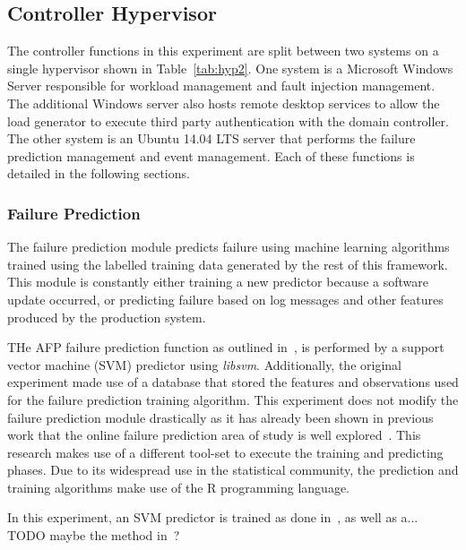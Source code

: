 \tabHypervisorOne
\tabHypervisorTwo

\setcounter{secnumdepth}{5}

\subsection{Controller Hypervisor} \label{sec:controller} %
The controller functions in this experiment are split between two systems on a
single hypervisor shown in Table~\ref{tab:hyp2}.  One system is a Microsoft
Windows Server responsible for workload management and fault injection
management.  The additional Windows server also hosts remote desktop services
to allow the load generator to execute third party authentication with the
domain controller.  The other system is an Ubuntu 14.04 LTS server that
performs the failure prediction management and event management.  Each of
these functions is detailed in the following sections.

\subsubsection{Failure Prediction} \label{sec:failurePrediction} %
The failure prediction module predicts failure using machine learning
algorithms trained using the labelled training data generated by the rest of
this framework.  This module is constantly either training a new predictor
because a software update occurred, or predicting failure based on log messages
and other features produced by the production system.

THe AFP failure prediction function as outlined in~\cite{irrera2015}, is
performed by a support vector machine (SVM) predictor using \emph{libsvm}.
Additionally, the original experiment made use of a database that stored the
features and observations used for the failure prediction training algorithm.
This experiment does not modify the failure prediction module drastically as it
has already been shown in previous work that the online failure prediction area
of study is well explored~\cite{salfnerSurvey}.  This research makes use of a
different tool-set to execute the training and predicting phases.  Due to its
widespread use in the statistical community, the prediction and training
algorithms make use of the R programming language.

In this experiment, an SVM predictor is trained as done in~\cite{irrera2015},
as well as a... TODO maybe the method in~\cite{watanabe2014}?

